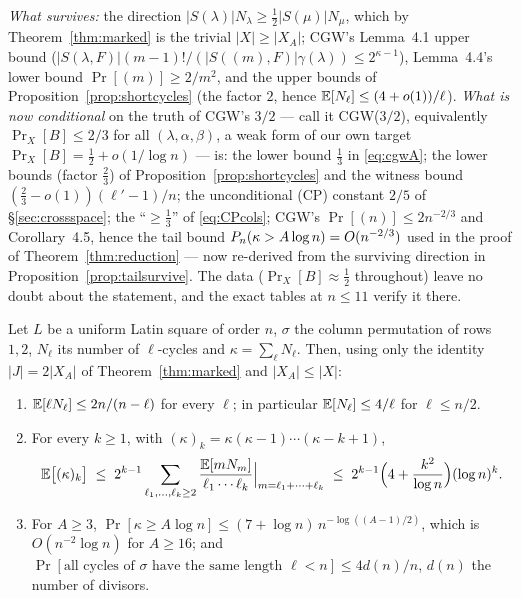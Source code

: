 \begin{remark}
\emph{What survives:} the direction
$|S(\lambda)|N_\lambda\ge\tfrac12|S(\mu)|N_\mu$, which by
Theorem~\ref{thm:marked} is the trivial $|X|\ge|X_A|$; CGW's
Lemma~4.1 upper bound ($|S(\lambda,F)|(m-1)!/(|S((m),F)|\gamma(\lambda))\le2^{\kappa-1}$),
Lemma~4.4's lower bound $\Pr[(m)]\ge2/m^2$, and the upper bounds of
Proposition~\ref{prop:shortcycles} (the factor $2$, hence
$\mathbb{E}[N_\ell]\le(4+o(1))/\ell$).  \emph{What is now conditional} on the
truth of CGW's $3/2$ --- call it \textup{CGW($3/2$)}, equivalently
$\Pr_X[B]\le2/3$ for all $(\lambda,\alpha,\beta)$, a weak form of our
own target $\Pr_X[B]=\tfrac12+o(1/\log n)$ --- is: the lower bound
$\tfrac13$ in \eqref{eq:cgwA}; the lower bounds (factor $\tfrac23$) of
Proposition~\ref{prop:shortcycles} and the witness bound
$(\tfrac23-o(1))(\ell'-1)/n$; the unconditional (CP) constant $2/5$
of \S\ref{sec:crossspace}; the ``$\ge\tfrac13$'' of \eqref{eq:CPcols};
CGW's $\Pr[(n)]\le2n^{-2/3}$ and Corollary~4.5, hence the tail bound
$P_n(\kappa>A\log n)=O(n^{-2/3})$ used in the proof of
Theorem~\ref{thm:reduction} --- now re-derived from the surviving
direction in Proposition~\ref{prop:tailsurvive}.  The
data ($\Pr_X[B]\approx\tfrac12$ throughout) leave no doubt about the
statement, and the exact tables at $n\le11$ verify it there.
\end{remark}

\begin{proposition}\label{prop:tailsurvive}
Let $L$ be a uniform Latin square of order $n$, $\sigma$ the column
permutation of rows $1,2$, $N_\ell$ its number of $\ell$-cycles and
$\kappa=\sum_\ell N_\ell$.  Then, using only the identity
$|J|=2|X_A|$ of Theorem~\ref{thm:marked} and $|X_A|\le|X|$:
\begin{enumerate}[leftmargin=2em]
\item[(i)] $\mathbb{E}[\ell N_\ell]\le2n/(n-\ell)$ for every $\ell$; in
particular $\mathbb{E}[N_\ell]\le4/\ell$ for $\ell\le n/2$.
\item[(ii)] For every $k\ge1$, with $(\kappa)_k=\kappa(\kappa-1)\cdots(\kappa-k+1)$,
\[
\mathbb{E}\bigl[(\kappa)_k\bigr]\;\le\;2^{k-1}\sum_{\ell_1,\dots,\ell_k\ge2}\frac{\mathbb{E}[mN_m]}{\ell_1\cdots\ell_k}\Big|_{m=\ell_1+\cdots+\ell_k}
\;\le\;2^{k-1}\Bigl(4+\frac{k^2}{\log n}\Bigr)(\log n)^k .
\]
\item[(iii)] For $A\ge3$, $\Pr[\kappa\ge A\log n]\le(7+\log n)\,n^{-\log((A-1)/2)}$,
which is $O(n^{-2}\log n)$ for $A\ge16$;
and $\Pr[\text{all cycles of }\sigma\text{ have the same length }\ell<n]\le4d(n)/n$,
$d(n)$ the number of divisors.
\end{enumerate}
\end{proposition}

